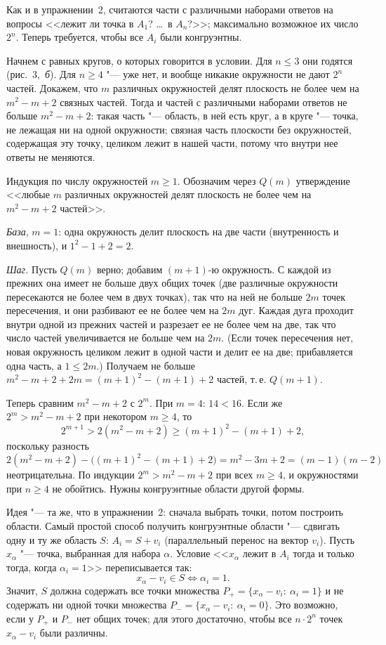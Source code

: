 \begin{solution}[3 (\S\,2)]
Как и в упражнении~2, считаются части с различными наборами ответов на
вопросы <<лежит ли точка в $A_1$? \dots\ в $A_n$?>>; максимально возможное
их число $2^n$. Теперь требуется, чтобы все $A_i$ были конгруэнтны.

Начнем с равных кругов, о которых говорится в условии. Для $n\le3$ они
годятся (рис.~3,~\emph{б}). Для $n\ge4$ "--- уже нет, и вообще никакие
окружности не дают $2^n$ частей. Докажем, что $m$ различных окружностей
делят плоскость не более чем на $m^2-m+2$ связных частей. Тогда и частей
с различными наборами ответов не больше $m^2-m+2$: такая часть "--- область,
в ней есть круг, а в круге "--- точка, не лежащая ни на одной окружности;
связная часть плоскости без окружностей, содержащая эту точку, целиком
лежит в нашей части, потому что внутри нее ответы не меняются.

Индукция по числу окружностей $m\ge1$. Обозначим через $Q(m)$ утверждение
<<любые $m$ различных окружностей делят плоскость не более чем на
$m^2-m+2$ частей>>.

\emph{База}, $m=1$: одна окружность делит плоскость на две части
(внутренность и внешность), и $1^2-1+2=2$.

\emph{Шаг.} Пусть $Q(m)$ верно; добавим $(m+1)$-ю окружность. С каждой из
прежних она имеет не больше двух общих точек (две различные окружности
пересекаются не более чем в двух точках), так что на ней не больше $2m$
точек пересечения, и они разбивают ее не более чем на $2m$ дуг. Каждая дуга
проходит внутри одной из прежних частей и разрезает ее не более чем на две,
так что число частей увеличивается не больше чем на $2m$. (Если точек
пересечения нет, новая окружность целиком лежит в одной части и делит ее
на две; прибавляется одна часть, а $1\le2m$.) Получаем не больше
$m^2-m+2+2m=(m+1)^2-(m+1)+2$ частей, т.\,е. $Q(m+1)$.

Теперь сравним $m^2-m+2$ с $2^m$. При $m=4$: $14<16$. Если же
$2^m>m^2-m+2$ при некотором $m\ge4$, то
\[
2^{m+1}>2(m^2-m+2)\ge(m+1)^2-(m+1)+2,
\]
поскольку разность $2(m^2-m+2)-\bigl((m+1)^2-(m+1)+2\bigr)=m^2-3m+2=
(m-1)(m-2)$ неотрицательна. По индукции $2^m>m^2-m+2$ при всех $m\ge4$,
и окружностями при $n\ge4$ не обойтись. Нужны конгруэнтные области другой
формы.

Идея "--- та же, что в упражнении~2: сначала выбрать точки, потом построить
области. Самый простой способ получить конгруэнтные области "--- сдвигать
одну и ту же область $S$: $A_i=S+v_i$ (параллельный перенос на вектор
$v_i$). Пусть $x_\alpha$ "--- точка, выбранная для набора $\alpha$. Условие
<<$x_\alpha$ лежит в $A_i$ тогда и только тогда, когда $\alpha_i=1$>>
переписывается так:
\[
x_\alpha-v_i\in S\iff\alpha_i=1 .
\]
Значит, $S$ должна содержать все точки множества
$P_+=\{x_\alpha-v_i:\ \alpha_i=1\}$ и не содержать ни одной точки множества
$P_-=\{x_\alpha-v_i:\ \alpha_i=0\}$. Это возможно, если у $P_+$ и $P_-$
нет общих точек; для этого достаточно, чтобы все $n\cdot2^n$ точек
$x_\alpha-v_i$ были различны.


\end{solution}
